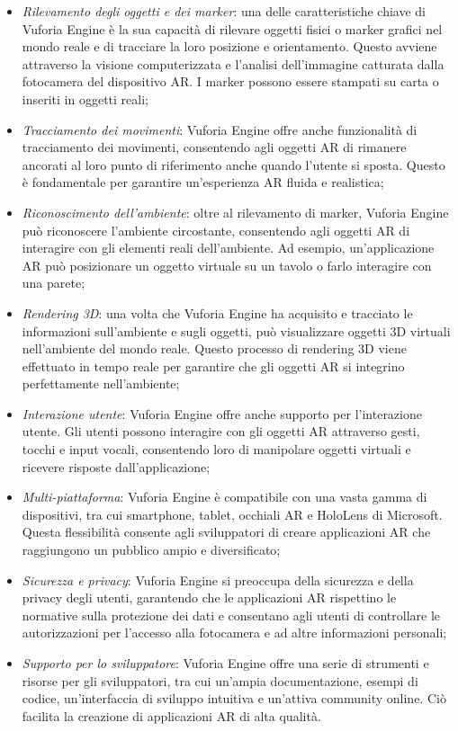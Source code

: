 \begin{itemize}
    \item \textit{Rilevamento degli oggetti e dei marker}: una delle caratteristiche chiave di Vuforia Engine è la sua capacità di rilevare oggetti fisici o marker grafici nel mondo reale e di tracciare la loro posizione e orientamento. Questo avviene attraverso la visione computerizzata e l'analisi dell'immagine catturata dalla fotocamera del dispositivo AR. I marker possono essere stampati su carta o inseriti in oggetti reali; 
    \item \textit{Tracciamento dei movimenti}: Vuforia Engine offre anche funzionalità di tracciamento dei movimenti, consentendo agli oggetti AR di rimanere ancorati al loro punto di riferimento anche quando l'utente si sposta. Questo è fondamentale per garantire un'esperienza AR fluida e realistica; 
    \item \textit{Riconoscimento dell'ambiente}: oltre al rilevamento di marker, Vuforia Engine può riconoscere l'ambiente circostante, consentendo agli oggetti AR di interagire con gli elementi reali dell'ambiente. Ad esempio, un'applicazione AR può posizionare un oggetto virtuale su un tavolo o farlo interagire con una parete;
    \item \textit{Rendering 3D}: una volta che Vuforia Engine ha acquisito e tracciato le informazioni sull'ambiente e sugli oggetti, può visualizzare oggetti 3D virtuali nell'ambiente del mondo reale. Questo processo di rendering 3D viene effettuato in tempo reale per garantire che gli oggetti AR si integrino perfettamente nell'ambiente; 
    \item \textit{Interazione utente}: Vuforia Engine offre anche supporto per l'interazione utente. Gli utenti possono interagire con gli oggetti AR attraverso gesti, tocchi e input vocali, consentendo loro di manipolare oggetti virtuali e ricevere risposte dall'applicazione; 
    \item \textit{Multi-piattaforma}: Vuforia Engine è compatibile con una vasta gamma di dispositivi, tra cui smartphone, tablet, occhiali AR e HoloLens di Microsoft. Questa flessibilità consente agli sviluppatori di creare applicazioni AR che raggiungono un pubblico ampio e diversificato; 
    \item \textit{Sicurezza e privacy}: Vuforia Engine si preoccupa della sicurezza e della privacy degli utenti, garantendo che le applicazioni AR rispettino le normative sulla protezione dei dati e consentano agli utenti di controllare le autorizzazioni per l'accesso alla fotocamera e ad altre informazioni personali; 
    \item \textit{Supporto per lo sviluppatore}: Vuforia Engine offre una serie di strumenti e risorse per gli sviluppatori, tra cui un'ampia documentazione, esempi di codice, un'interfaccia di sviluppo intuitiva e un'attiva community online. Ciò facilita la creazione di applicazioni AR di alta qualità.
\end{itemize}

